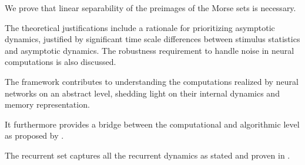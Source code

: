 \documentclass[12pt,letterpaper, onecolumn]{article}
\theoremstyle{definition}
\theoremstyle{remark}
\begin{document}
We prove that linear separability of the preimages of the Morse sets \cite{mischaikow1999} is necessary.


The theoretical justifications include a rationale for prioritizing asymptotic dynamics, justified by significant time scale differences between stimulus statistics and asymptotic dynamics. The robustness requirement to handle noise in neural computations is also discussed.

The framework contributes to understanding the computations realized by neural networks on an abstract level, shedding light on their internal dynamics and memory representation.

It furthermore provides a bridge between the computational and algorithmic level as proposed by \cite{marr2010}.

The recurrent set captures all the recurrent dynamics as stated and proven in \cite[Chapter I.8.2]{conley1978}.



  \printbibliography
\end{document}
